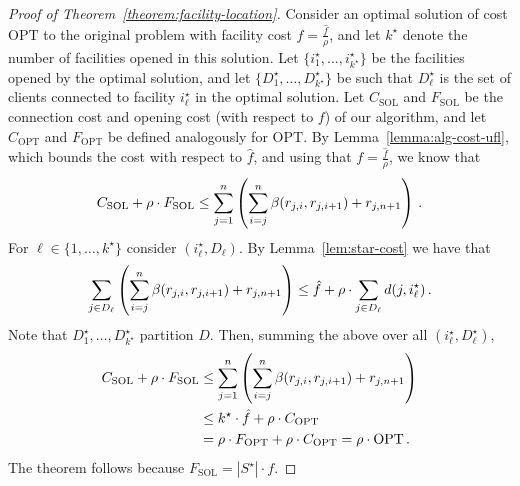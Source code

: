 \begin{proof}[Proof of Theorem~\ref{theorem:facility-location}]
 Consider an optimal solution of cost $\mathrm{OPT}$ to the original problem with facility cost $f = \frac{\hat{f}}{\rho}$, and let $k^\star$ denote the number of facilities opened in this solution.
    Let $\{i_1^\star, \ldots, i_{k^\star}^\star\}$ be the facilities opened by the optimal solution, and let $\{D_1^\star, \ldots, D_{k^\star}^\star\}$ be such that $D_\ell^\star$ is the set of clients connected to facility $i_\ell^\star$ in the optimal solution.
    Let $C_{\mathrm{SOL}}$ and $F_{\mathrm{SOL}}$ be the connection cost and opening cost (with respect to $f$) of our algorithm, and let $C_{\mathrm{OPT}}$ and $F_{\mathrm{OPT}}$ be defined analogously for $\mathrm{OPT}$.
    By Lemma~\ref{lemma:alg-cost-ufl}, which bounds the cost with respect to $\hat{f}$, and using that $f = \frac{\hat{f}}{\rho}$, we know that 
    \[
        C_{\mathrm{SOL}} + \rho \cdot F_{\mathrm{SOL}} \leq \sum_{j=1}^n \left(\sum_{i=j}^{n} \beta(r_{j,i}, r_{j,i+1}) + r_{j,n+1}\right)\,.
    \]
    For $\ell \in \{1, \ldots, k^\star\}$ consider $(i^\star_\ell, D_\ell)$. By Lemma~\ref{lem:star-cost} we have that
    \[\sum_{j \in D_\ell} \left(\sum_{i=j}^n \beta(r_{j,i}, r_{j,i+1}) + r_{j,n+1}\right) \leq \hat{f} + \rho \cdot \sum_{j \in D_\ell} d(j, i^\star_\ell)\,.\]
    Note that $D_1^\star, \ldots, D^\star_{k^\star}$ partition $D$. Then, summing the above over all $(i_{\ell}^\star, D^\star_{\ell})$,
    \begin{align*}
    C_{\mathrm{SOL}} + \rho \cdot F_{\mathrm{SOL}} & \le \sum_{j=1}^n \left(\sum_{i=j}^{n} \beta(r_{j,i}, r_{j,i+1}) + r_{j,n+1}\right)\\
    &\leq k^\star \cdot \hat{f} + \rho \cdot C_{\mathrm{OPT}}\\
    &= \rho \cdot F_{\mathrm{OPT}} + \rho \cdot C_{\mathrm{OPT}}
    = \rho \cdot \mathrm{OPT}\,.
    \end{align*}
    The theorem follows because $F_{\mathrm{SOL}} = |S^\star| \cdot f$.
\end{proof}



